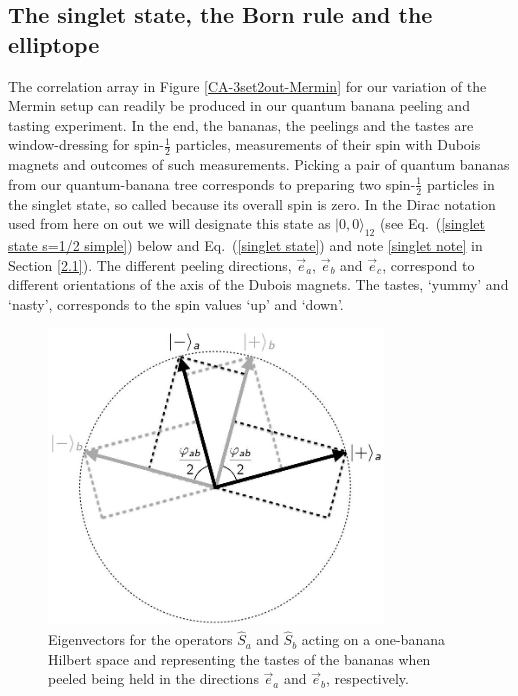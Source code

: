 
\subsection{The singlet state, the Born rule and the elliptope} \label{1.5}

The correlation array in Figure \ref{CA-3set2out-Mermin} for our variation of the Mermin setup  can readily be produced in our quantum banana peeling and tasting experiment. In the end, the bananas, the peelings and the tastes are window-dressing for spin-$\frac12$ particles, measurements of their spin with Dubois magnets and outcomes of such measurements. Picking a pair of quantum bananas from our quantum-banana tree corresponds to preparing two spin-$\frac12$ particles in the singlet state, so called because its overall spin is zero. In the Dirac notation used from here on out we will designate this state as $|0, 0\rangle_{12}$ (see Eq.\ (\ref{singlet state s=1/2 simple}) below and Eq.\ (\ref{singlet state}) and note \ref{singlet note} in Section \ref{2.1}). The different peeling directions, $\vec{e}_a$, $\vec{e}_b$ and $\vec{e}_c$, correspond to different orientations of the axis of the Dubois magnets. The tastes, `yummy' and `nasty', corresponds to the spin values `up' and `down'. 

\begin{figure}[h!]
 \centering
   \includegraphics[width=3.5in]{vectors.jpeg} 
   \caption{Eigenvectors for the operators $\hat{S}_a$ and $\hat{S}_b$ acting on a one-banana Hilbert space and representing the tastes of the bananas when peeled being held in the directions $\vec{e}_a$ and $\vec{e}_b$, respectively.}
   \label{vectors}
\end{figure}

